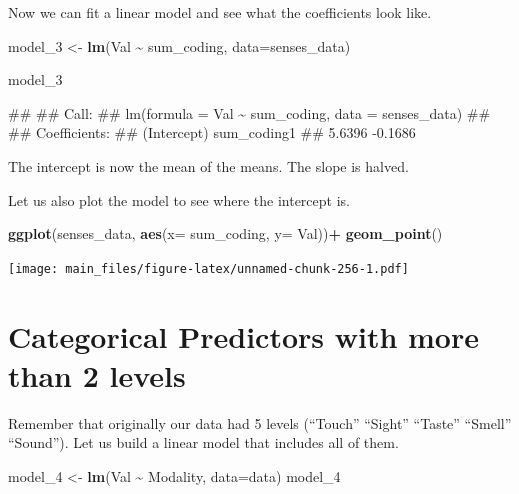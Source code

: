 \documentclass[
]{book}
\newenvironment{Shaded}{\begin{snugshade}}{\end{snugshade}}
\newcommand{\AttributeTok}[1]{\textcolor[rgb]{0.13,0.29,0.53}{#1}}
\newcommand{\FunctionTok}[1]{\textcolor[rgb]{0.13,0.29,0.53}{\textbf{#1}}}
\newcommand{\NormalTok}[1]{#1}
\newcommand{\OtherTok}[1]{\textcolor[rgb]{0.56,0.35,0.01}{#1}}
\newcommand{\SpecialCharTok}[1]{\textcolor[rgb]{0.81,0.36,0.00}{\textbf{#1}}}
\begin{document}
Now we can fit a linear model and see what the coefficients look like.

\begin{Shaded}
\begin{Highlighting}[]
\NormalTok{model\_3 }\OtherTok{\textless{}{-}} \FunctionTok{lm}\NormalTok{(Val }\SpecialCharTok{\textasciitilde{}}\NormalTok{ sum\_coding, }\AttributeTok{data=}\NormalTok{senses\_data)}

\NormalTok{model\_3}
\end{Highlighting}
\end{Shaded}

\begin{Shaded}
\begin{Highlighting}[]
\NormalTok{\#\# }
\NormalTok{\#\# Call:}
\NormalTok{\#\# lm(formula = Val \textasciitilde{} sum\_coding, data = senses\_data)}
\NormalTok{\#\# }
\NormalTok{\#\# Coefficients:}
\NormalTok{\#\# (Intercept)  sum\_coding1  }
\NormalTok{\#\#      5.6396      {-}0.1686}
\end{Highlighting}
\end{Shaded}

The intercept is now the mean of the means. The slope is halved.

Let us also plot the model to see where the intercept is.

\begin{Shaded}
\begin{Highlighting}[]
\FunctionTok{ggplot}\NormalTok{(senses\_data, }\FunctionTok{aes}\NormalTok{(}\AttributeTok{x=}\NormalTok{ sum\_coding, }\AttributeTok{y=}\NormalTok{ Val))}\SpecialCharTok{+}
  \FunctionTok{geom\_point}\NormalTok{()}
\end{Highlighting}
\end{Shaded}

\texttt{[image: main\_files/figure-latex/unnamed-chunk-256-1.pdf]}

\section{Categorical Predictors with more than 2 levels}\label{categorical-predictors-with-more-than-2-levels}

Remember that originally our data had 5 levels (``Touch'' ``Sight'' ``Taste'' ``Smell'' ``Sound''). Let us build a linear model that includes all of them.

\begin{Shaded}
\begin{Highlighting}[]
\NormalTok{model\_4 }\OtherTok{\textless{}{-}} \FunctionTok{lm}\NormalTok{(Val }\SpecialCharTok{\textasciitilde{}}\NormalTok{ Modality, }\AttributeTok{data=}\NormalTok{data)}
\NormalTok{model\_4}
\end{Highlighting}
\end{Shaded}
\end{document}
